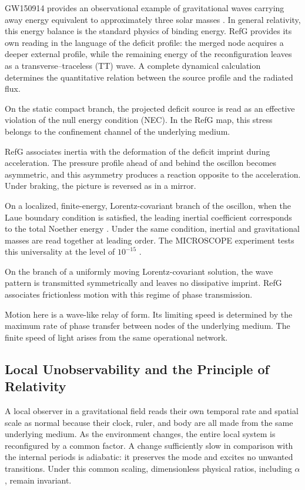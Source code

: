 \documentclass[11pt,a4paper]{article}
\begin{document}
GW150914 provides an observational example of gravitational waves carrying away energy equivalent to approximately three solar masses \citep{abbott2016}. In general relativity, this energy balance is the standard physics of binding energy. RefG provides its own reading in the language of the deficit profile: the merged node acquires a deeper external profile, while the remaining energy of the reconfiguration leaves as a transverse--traceless (TT) wave. A complete dynamical calculation determines the quantitative relation between the source profile and the radiated flux.

On the static compact branch, the projected deficit source is read as an effective violation of the null energy condition (NEC). In the RefG map, this stress belongs to the confinement channel of the underlying medium.

RefG associates inertia with the deformation of the deficit imprint during acceleration. The pressure profile ahead of and behind the oscillon becomes asymmetric, and this asymmetry produces a reaction opposite to the acceleration. Under braking, the picture is reversed as in a mirror.

On a localized, finite-energy, Lorentz-covariant branch of the oscillon, when the Laue boundary condition is satisfied, the leading inertial coefficient corresponds to the total Noether energy \citep{noether1918,laue1911}. Under the same condition, inertial and gravitational masses are read together at leading order. The MICROSCOPE experiment tests this universality at the level of $10^{-15}$ \citep{touboul2022}.

On the branch of a uniformly moving Lorentz-covariant solution, the wave pattern is transmitted symmetrically and leaves no dissipative imprint. RefG associates frictionless motion with this regime of phase transmission.

Motion here is a wave-like relay of form. Its limiting speed is determined by the maximum rate of phase transfer between nodes of the underlying medium. The finite speed of light arises from the same operational network.

\subsection{Local Unobservability and the Principle of Relativity}

A local observer in a gravitational field reads their own temporal rate and spatial scale as normal because their clock, ruler, and body are all made from the same underlying medium. As the environment changes, the entire local system is reconfigured by a common factor. A change sufficiently slow in comparison with the internal periods is adiabatic: it preserves the mode and excites no unwanted transitions. Under this common scaling, dimensionless physical ratios, including $\alpha$, remain invariant.
\end{document}
